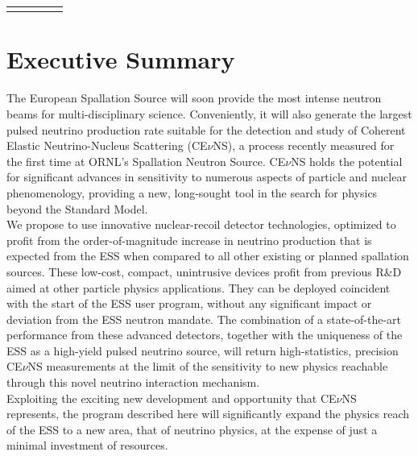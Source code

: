 \documentclass[12pt]{article}
\begin{document}
\begin{titlepage}
\begin{table}[]
\begin{tabular}{lllll}
 &                       &                                              &                                                                                         &                                                                             
\end{tabular}
\end{table}
\pagebreak


\end{titlepage}


\clearpage
\newpage
\tableofcontents
\newpage     


\section{Executive Summary}

The European Spallation Source will soon provide the most intense neutron beams for
multi-disciplinary science. Conveniently, it will also generate the
largest pulsed neutrino production rate suitable for the detection and study of Coherent
Elastic Neutrino-Nucleus Scattering (CE$\nu$NS), a process recently
measured for the first time at ORNL's Spallation Neutron Source. CE$\nu$NS holds the potential for significant advances in sensitivity to numerous aspects of particle and nuclear phenomenology, providing a new, long-sought tool in the search for physics beyond the Standard Model.\\

We propose to use innovative nuclear-recoil detector technologies, optimized to profit
from the order-of-magnitude increase in neutrino production that is expected from 
the ESS when compared to all other existing or planned spallation sources. These low-cost, compact, unintrusive devices profit from previous R\&D aimed at other particle physics applications. They can be deployed coincident with the start of the ESS user program, without any significant impact or deviation from the ESS neutron mandate. The combination of a state-of-the-art performance from these advanced detectors, together with the uniqueness of the ESS as a high-yield pulsed neutrino source, will return high-statistics, precision CE$\nu$NS
measurements at the limit of the sensitivity to new physics reachable through this novel neutrino interaction mechanism. \\

Exploiting the exciting new development and opportunity that CE$\nu$NS represents, the program described here will significantly expand the physics reach of the ESS to a new area, that of neutrino physics, at the expense of just a minimal investment of resources. 
\end{document}
